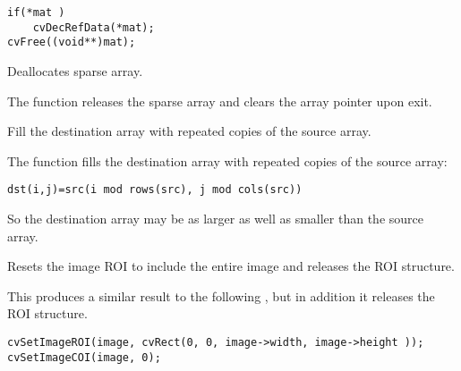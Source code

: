 \begin{lstlisting}
if(*mat )
    cvDecRefData(*mat);
cvFree((void**)mat);
\end{lstlisting}

Deallocates sparse array.


\begin{description}
\end{description}

The function releases the sparse array and clears the array pointer upon exit.

\fi

Fill the destination array with repeated copies of the source array.


\begin{description}
\end{description}

The function fills the destination array with repeated copies of the source array:

\begin{lstlisting}
dst(i,j)=src(i mod rows(src), j mod cols(src))
\end{lstlisting}

So the destination array may be as larger as well as smaller than the source array.

Resets the image ROI to include the entire image and releases the ROI structure.


\begin{description}
\end{description}

This produces a similar result to the following
\ifC
, but in addition it releases the ROI structure.

\begin{lstlisting}
cvSetImageROI(image, cvRect(0, 0, image->width, image->height ));
cvSetImageCOI(image, 0);
\end{lstlisting}
\else

